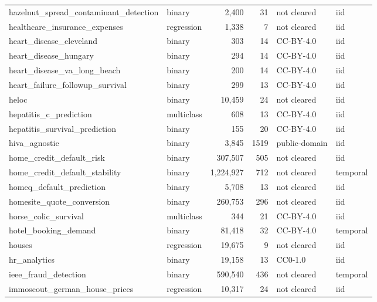 \begin{longtable}{>{\raggedright\arraybackslash}p{5.5cm}lrrll}
hazelnut\_\allowbreak{}spread\_\allowbreak{}contaminant\_\allowbreak{}detection & binary & 2,400 & 31 & not cleared & iid\\
healthcare\_\allowbreak{}insurance\_\allowbreak{}expenses & regression & 1,338 & 7 & not cleared & iid\\
heart\_\allowbreak{}disease\_\allowbreak{}cleveland & binary & 303 & 14 & CC-BY-4.0 & iid\\
heart\_\allowbreak{}disease\_\allowbreak{}hungary & binary & 294 & 14 & CC-BY-4.0 & iid\\
heart\_\allowbreak{}disease\_\allowbreak{}va\_\allowbreak{}long\_\allowbreak{}beach & binary & 200 & 14 & CC-BY-4.0 & iid\\
heart\_\allowbreak{}failure\_\allowbreak{}followup\_\allowbreak{}survival & binary & 299 & 13 & CC-BY-4.0 & iid\\
heloc & binary & 10,459 & 24 & not cleared & iid\\
hepatitis\_\allowbreak{}c\_\allowbreak{}prediction & multiclass & 608 & 13 & CC-BY-4.0 & iid\\
hepatitis\_\allowbreak{}survival\_\allowbreak{}prediction & binary & 155 & 20 & CC-BY-4.0 & iid\\
hiva\_\allowbreak{}agnostic & binary & 3,845 & 1519 & public-domain & iid\\
home\_\allowbreak{}credit\_\allowbreak{}default\_\allowbreak{}risk & binary & 307,507 & 505 & not cleared & iid\\
home\_\allowbreak{}credit\_\allowbreak{}default\_\allowbreak{}stability & binary & 1,224,927 & 712 & not cleared & temporal\\
homeq\_\allowbreak{}default\_\allowbreak{}prediction & binary & 5,708 & 13 & not cleared & iid\\
homesite\_\allowbreak{}quote\_\allowbreak{}conversion & binary & 260,753 & 296 & not cleared & iid\\
horse\_\allowbreak{}colic\_\allowbreak{}survival & multiclass & 344 & 21 & CC-BY-4.0 & iid\\
hotel\_\allowbreak{}booking\_\allowbreak{}demand & binary & 81,418 & 32 & CC-BY-4.0 & temporal\\
houses & regression & 19,675 & 9 & not cleared & iid\\
hr\_\allowbreak{}analytics & binary & 19,158 & 13 & CC0-1.0 & iid\\
ieee\_\allowbreak{}fraud\_\allowbreak{}detection & binary & 590,540 & 436 & not cleared & temporal\\
immoscout\_\allowbreak{}german\_\allowbreak{}house\_\allowbreak{}prices & regression & 10,317 & 24 & not cleared & iid\\

\end{longtable}
